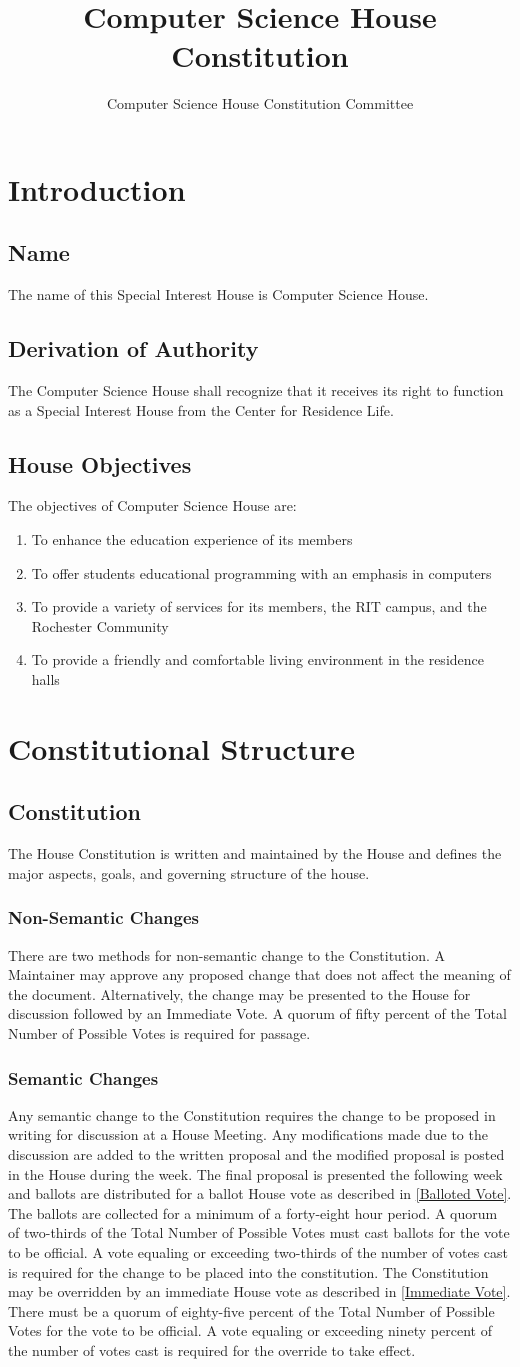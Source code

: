 \documentclass{article}
\title{Computer Science House Constitution}
\author{Computer Science House Constitution Committee}
\date{\datechanged}
\newcommand{\article}[1]{\section{#1} \label{#1}}
\newcommand{\asection}[1]{\subsection{#1} \label{#1}}
\newcommand{\asubsection}[1]{\subsubsection{#1} \label{#1}}
\begin{document}
\maketitle

\tableofcontents

\article{Introduction}

\asection{Name}
The name of this Special Interest House is Computer Science House.

\asection{Derivation of Authority}
The Computer Science House shall recognize that it receives its right to function as a Special Interest House from the Center for Residence Life.

\asection{House Objectives}
The objectives of Computer Science House are:
\begin{enumerate}
	\item To enhance the education experience of its members
	\item To offer students educational programming with an emphasis in computers
	\item To provide a variety of services for its members, the RIT campus, and the Rochester Community
	\item To provide a friendly and comfortable living environment in the residence halls
\end{enumerate}

\article{Constitutional Structure}

\asection{Constitution}
The House Constitution is written and maintained by the House and defines the major aspects, goals, and governing structure of the house.

\asubsection{Non-Semantic Changes}
There are two methods for non-semantic change to the Constitution.
A Maintainer may approve any proposed change that does not affect the meaning of the document.
Alternatively, the change may be presented to the House for discussion followed by an Immediate Vote.
A quorum of fifty percent of the Total Number of Possible Votes is required for passage.

\asubsection{Semantic Changes}
Any semantic change to the Constitution requires the change to be proposed in writing for discussion at a House Meeting.
Any modifications made due to the discussion are added to the written proposal and the modified proposal is posted in the House during the week.
The final proposal is presented the following week and ballots are distributed for a ballot House vote as described in \ref{Balloted Vote}.
The ballots are collected for a minimum of a forty-eight hour period.
A quorum of two-thirds of the Total Number of Possible Votes must cast ballots for the vote to be official.
A vote equaling or exceeding two-thirds of the number of votes cast is required for the change to be placed into the constitution.
The Constitution may be overridden by an immediate House vote as described in \ref{Immediate Vote}.
There must be a quorum of eighty-five percent of the Total Number of Possible Votes for the vote to be official.
A vote equaling or exceeding ninety percent of the number of votes cast is required for the override to take effect.
\end{document}
